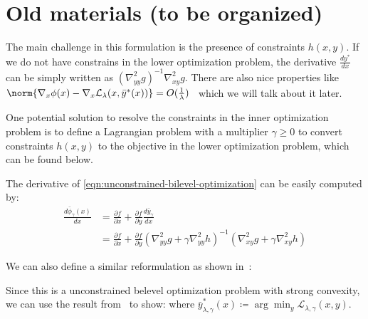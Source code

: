 \section{Old materials (to be organized)}


The main challenge in this formulation is the presence of constraints $h(x,y)$. If we do not have constrains in the lower optimization problem, the derivative $\frac{dy^*}{dx}$ can be simply written as $(\nabla^2_{yy} g)^{-1} \nabla^2_{xy} g$. There are also nice properties like $\norm{\nabla_x \phi(x) - \nabla_x \mathcal{L}_\lambda(x,\bar{y}^*(x))} = O(\frac{1}{\lambda})$~\cite{chen2023near,kwon2023fully} which we will talk about it later.


One potential solution to resolve the constraints in the inner optimization problem is to define a Lagrangian problem with a multiplier $\gamma \geq 0$ to convert constraints $h(x,y)$ to the objective in the lower optimization problem, which can be found below.

The derivative of \cref{eqn:unconstrained-bilevel-optimization} can be easily computed by:
\begin{align}
    \frac{d \bar{\phi}_\gamma(x)}{d x} & = \frac{\partial f}{\partial x} + \frac{\partial f}{\partial y} \frac{d \bar{y}_\gamma}{d x} \nonumber \\
    & = \frac{\partial f}{\partial x} + \frac{\partial f}{\partial y} (\nabla^2_{yy} g + \gamma \nabla_{yy}^2 h)^{-1} (\nabla^2_{xy} g + \gamma \nabla_{xy}^2 h)
\end{align}

We can also define a similar reformulation as shown in~\cite{chen2023near,kwon2023fully}:

Since this is a unconstrained belevel optimization problem with strong convexity, we can use the result from~\cite{chen2023near,kwon2023fully} to show:
where $\bar{y}^*_{\lambda,\gamma}(x) \coloneqq \arg\min_{y} \mathcal{L}_{\lambda,\gamma}(x,y)$.  

